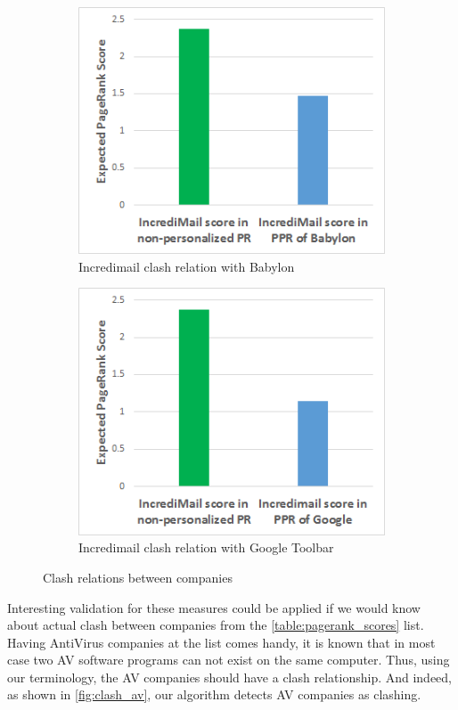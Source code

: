 \documentclass[11pt,oneside]{book}
\begin{document}
\begin{figure}[h]
\centering
\begin{subfigure}[b]{0.8\textwidth}
	\centering
\includegraphics[scale=0.8]{figures/incredi_clash_babylon.png}
\caption{Incredimail clash relation with Babylon}
\label{fig:incredi_clash_babylon}
\end{subfigure}
\begin{subfigure}[b]{0.8\textwidth}
	\centering
\includegraphics[scale=0.8]{figures/incredi_clash_google.png}
\caption{Incredimail clash relation with Google Toolbar}
\label{fig:incredi_clash_google}
\end{subfigure}
\caption{Clash relations between companies}
	\label{fig:clash_2}
\end{figure}

Interesting validation for these measures could be applied if we would know about actual clash between companies from the \autoref{table:pagerank_scores} list. Having AntiVirus companies at the list comes handy, it is known that in most case two AV software programs can not exist on the same computer. Thus, using our terminology, the AV companies should have a clash relationship. And indeed, as shown in \autoref{fig:clash_av}, our algorithm detects AV companies as clashing.
\end{document}
